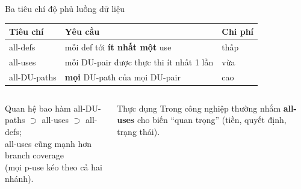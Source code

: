 \documentclass[aspectratio=169,12pt]{beamer}
\begin{document}
\begin{frame}{Ba tiêu chí độ phủ luồng dữ liệu}
  \begin{center}
  \small
  \begin{tabular}{lll}
    \toprule
    \textbf{Tiêu chí} & \textbf{Yêu cầu} & \textbf{Chi phí} \\
    \midrule
    all-defs     & mỗi def tới \textbf{ít nhất một} use      & thấp \\
    all-uses     & mỗi DU-pair được thực thi ít nhất 1 lần    & vừa \\
    all-DU-paths & \textbf{mọi} DU-path của mọi DU-pair       & cao \\
    \bottomrule
  \end{tabular}
  \end{center}

  \vspace{0.4em}
  \begin{columns}[T]
    \begin{block}{Quan hệ bao hàm}
      all-DU-paths $\supset$ all-uses $\supset$ all-defs;\\
      all-uses cũng mạnh hơn branch coverage\\
      (mọi p-use kéo theo cả hai nhánh).
    \end{block}

    \begin{exampleblock}{Thực dụng}
      Trong công nghiệp thường nhắm \textbf{all-uses} cho
      biến ``quan trọng'' (tiền, quyết định, trạng thái).
    \end{exampleblock}
  \end{columns}
\end{frame}
\end{document}
